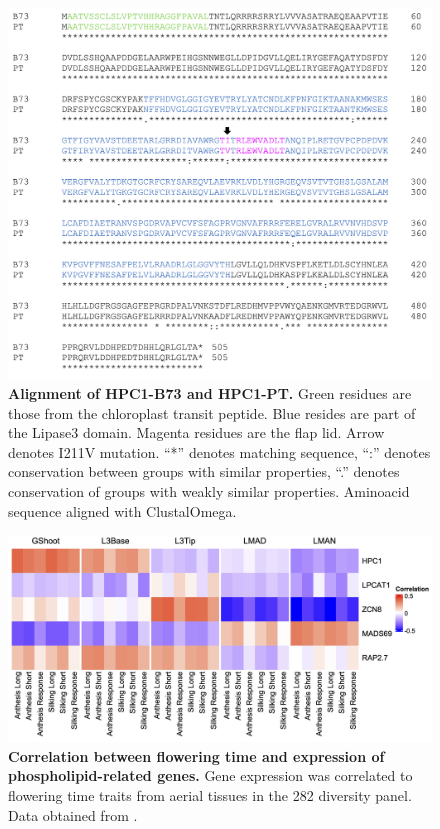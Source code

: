 \begin{figure}[t]
\begin{center}
\includegraphics[width=\linewidth]{Sup_Figures/Sup_Fig_10.png}
\caption[Alignment of HPC1-B73 and HPC1-PT.]
{\textbf{Alignment of HPC1-B73 and HPC1-PT.}
Green residues are those from the chloroplast transit peptide.
Blue resides are part of the Lipase3 domain. 
Magenta residues are the flap lid. 
Arrow denotes I211V mutation. “*” denotes matching sequence, “:” denotes conservation between groups with similar properties, “.” denotes conservation of groups with weakly similar properties.
Aminoacid sequence aligned with ClustalOmega.}
\label{figure:Sup:aa_alignment}
\end{center}
\end{figure} 
\clearpage

\begin{figure}[t]
\begin{center}
\includegraphics[width=\linewidth]{Sup_Figures/Sup_Fig_11.png}
\caption[Correlation between flowering time and expression of phospholipid-related genes.]
{\textbf{Correlation between flowering time and expression of phospholipid-related genes.} 
Gene expression was correlated to flowering time traits from aerial tissues in the 282 diversity panel. 
Data obtained from \citep{kremling2018-gn}.}
\label{figure:Sup:cor_heatmap}
\end{center}
\end{figure} 
\clearpage

